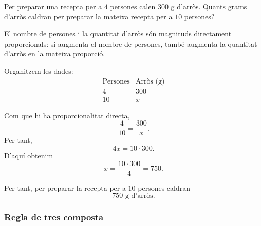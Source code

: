 \begin{exemple}
Per preparar una recepta per a \(4\) persones calen \(300\) g d'arròs. Quants grams d'arròs caldran per preparar la mateixa recepta per a \(10\) persones?
\end{exemple}

\begin{solucio}
El nombre de persones i la quantitat d'arròs són magnituds directament proporcionals: si augmenta el nombre de persones, també augmenta la quantitat d'arròs en la mateixa proporció.

Organitzem les dades:
\[
\begin{array}{c|c}
\text{Persones} & \text{Arròs (g)}\\
\hline
4 & 300\\
10 & x
\end{array}
\]

Com que hi ha proporcionalitat directa,
\[
	\frac{4}{10}=\frac{300}{x}.
\]
Per tant,
\[
	4x=10\cdot 300.
\]
D'aquí obtenim
\[
	x=\frac{10\cdot 300}{4}=750.
\]

Per tant, per preparar la recepta per a \(10\) persones caldran
\[
	750\text{ g d'arròs}.
\]
\end{solucio}

\subsubsection{Regla de tres composta}

